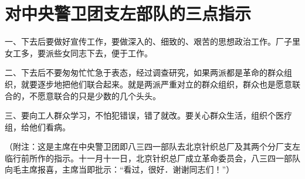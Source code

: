 \section[对中央警卫团支左部队的三点指示（一九六七年六月二十六日）]{对中央警卫团支左部队的三点指示}


一、下去后要做好宣传工作，要做深入的、细致的、艰苦的思想政治工作。厂子里女工多，要派些女同志下去，便于工作。

二、下去后不要匆匆忙忙急于表态，经过调查研究，如果两派都是革命的群众组织，就要逐步地把他们联合起来。就是两派严重对立的群众组织，群众也是愿意联合的，不愿意联合的只是少数的几个头头。

三、要向工人群众学习，不怕犯错误，错了就改。要关心群众生活，组织个医疗组，给他们看病。

（附注：这是主席在中央警卫团即八三四一部队去北京针织总厂及其两个分厂支左临行前所作的指示。十一月十一日，北京针织总厂成立革命委员会，八三四一部队向毛主席报喜，主席当即批示：“看过，很好．谢谢同志们！”）


